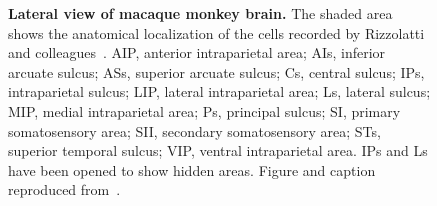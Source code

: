 \begin{figure}[htbp]
	\centering

	\caption[Lateral view of macaque monkey brain.]{\textbf{Lateral view of macaque monkey
	brain.}
	The shaded area shows the anatomical localization of the cells recorded by
	Rizzolatti and colleagues~\citep{rizzolatti.etal:1988}. 
	AIP, anterior intraparietal area;
	AIs, inferior arcuate sulcus;
	ASs, superior arcuate sulcus; 
	Cs, central sulcus; 
	IPs, intraparietal sulcus; 
	LIP, lateral intraparietal area; 
	Ls, lateral sulcus; 
	MIP, medial intraparietal area; 
	Ps, principal sulcus; 
	SI, primary somatosensory area; 
	SII, secondary somatosensory area; 
	STs, superior temporal sulcus; 
	VIP, ventral intraparietal area. 
	IPs and Ls have been opened to show hidden areas.
	Figure and caption reproduced from~\citet{rizzolatti.etal:1996}.}
	\label{fig:actions:mirror:brain-sx}
\end{figure}
